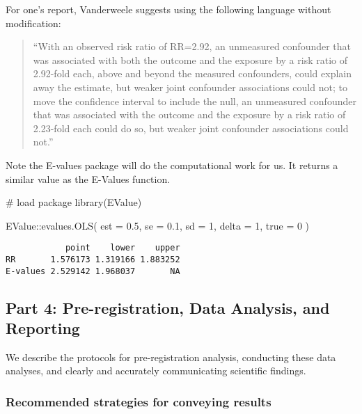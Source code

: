 \documentclass[
  singlecolumn]{article}
\newenvironment{Shaded}{\begin{snugshade}}{\end{snugshade}}
\newcommand{\AttributeTok}[1]{\textcolor[rgb]{0.40,0.45,0.13}{#1}}
\newcommand{\CommentTok}[1]{\textcolor[rgb]{0.37,0.37,0.37}{#1}}
\newcommand{\DecValTok}[1]{\textcolor[rgb]{0.68,0.00,0.00}{#1}}
\newcommand{\FloatTok}[1]{\textcolor[rgb]{0.68,0.00,0.00}{#1}}
\newcommand{\FunctionTok}[1]{\textcolor[rgb]{0.28,0.35,0.67}{#1}}
\newcommand{\NormalTok}[1]{\textcolor[rgb]{0.00,0.23,0.31}{#1}}
\newcommand{\SpecialCharTok}[1]{\textcolor[rgb]{0.37,0.37,0.37}{#1}}
\begin{document}
For one's report, Vanderweele suggests using the following language
without modification:

\begin{quote}
``With an observed risk ratio of RR=2.92, an unmeasured confounder that
was associated with both the outcome and the exposure by a risk ratio of
2.92-fold each, above and beyond the measured confounders, could explain
away the estimate, but weaker joint confounder associations could not;
to move the confidence interval to include the null, an unmeasured
confounder that was associated with the outcome and the exposure by a
risk ratio of 2.23-fold each could do so, but weaker joint confounder
associations could not.''
\end{quote}

Note the E-values package will do the computational work for us. It
returns a similar value as the E-Values function.

\begin{Shaded}
\begin{Highlighting}[]
\CommentTok{\# load package}
\FunctionTok{library}\NormalTok{(EValue)}

\NormalTok{EValue}\SpecialCharTok{::}\FunctionTok{evalues.OLS}\NormalTok{( }\AttributeTok{est =} \FloatTok{0.5}\NormalTok{, }\AttributeTok{se =} \FloatTok{0.1}\NormalTok{, }\AttributeTok{sd =} \DecValTok{1}\NormalTok{, }\AttributeTok{delta =} \DecValTok{1}\NormalTok{, }\AttributeTok{true =} \DecValTok{0}\NormalTok{ )}
\end{Highlighting}
\end{Shaded}

\begin{verbatim}
            point    lower    upper
RR       1.576173 1.319166 1.883252
E-values 2.529142 1.968037       NA
\end{verbatim}

\subsection{Part 4: Pre-registration, Data Analysis, and
Reporting}\label{part-4-pre-registration-data-analysis-and-reporting}

We describe the protocols for pre-registration analysis, conducting
these data analyses, and clearly and accurately communicating scientific
findings.

\subsubsection{Recommended strategies for conveying
results}\label{recommended-strategies-for-conveying-results}
\end{document}
